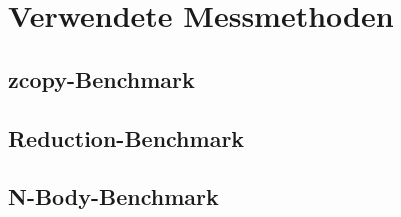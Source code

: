 \section{Verwendete Messmethoden}
\label{methoden}

\subsection{zcopy-Benchmark}

\subsection{Reduction-Benchmark}

\subsection{N-Body-Benchmark}

\cite{nguyen2007}
